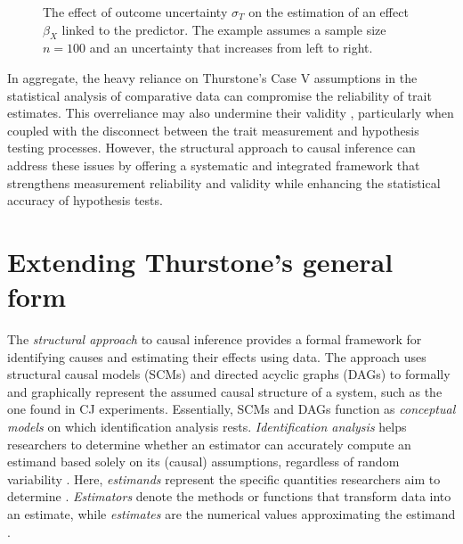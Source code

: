 \documentclass[
  authoryear,
  review,
  1p]{elsarticle}
\begin{document}
\begin{figure}


\caption{\label{fig-measurement_error}The effect of outcome uncertainty
\(\sigma_{T}\) on the estimation of an effect \(\beta_{X}\) linked to
the predictor. The example assumes a sample size \(n=100\) and an
uncertainty that increases from left to right.}

\end{figure}%

In aggregate, the heavy reliance on Thurstone's Case V assumptions in
the statistical analysis of comparative data can compromise the
reliability of trait estimates. This overreliance may also undermine
their validity \citep{Perron_et_al_2015}, particularly when coupled with
the disconnect between the trait measurement and hypothesis testing
processes. However, the structural approach to causal inference can
address these issues by offering a systematic and integrated framework
that strengthens measurement reliability and validity while enhancing
the statistical accuracy of hypothesis tests.

\section{Extending Thurstone's general form}\label{sec-theoretical}

The \emph{structural approach} to causal inference provides a formal
framework for identifying causes and estimating their effects using
data. The approach uses structural causal models (SCMs) and directed
acyclic graphs (DAGs)
\citep{Pearl_2009, Pearl_et_al_2016, Gross_et_al_2018, Neal_2020} to
formally and graphically represent the assumed causal structure of a
system, such as the one found in CJ experiments. Essentially, SCMs and
DAGs function as \emph{conceptual models} on which identification
analysis rests. \emph{Identification analysis} helps researchers to
determine whether an estimator can accurately compute an estimand based
solely on its (causal) assumptions, regardless of random variability
\citep{Schuessler_et_al_2023}. Here, \emph{estimands} represent the
specific quantities researchers aim to determine
\citep{Everitt_et_al_2010}. \emph{Estimators} denote the methods or
functions that transform data into an estimate, while \emph{estimates}
are the numerical values approximating the estimand
\citep{Neal_2020, Everitt_et_al_2010}.
\end{document}
